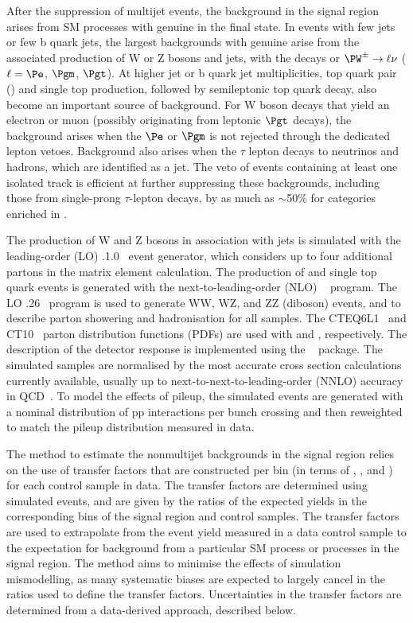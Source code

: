 After the suppression of multijet events, the background in the signal
region arises from SM processes with genuine \ptvecmiss in the final
state.  In events with few jets or few b quark jets, the largest
backgrounds with genuine \ptvecmiss arise from the associated
production of W or Z bosons and jets, with the decays \znunu or
$\PW^\pm \to  \ell\nu$ ($\ell=\Pe$, $\Pgm$, $\Pgt$). At
higher jet or b quark jet multiplicities, top quark pair (\ttbar) and
single top production, followed by semileptonic top quark decay, also
become an important source of background. For W boson decays that
yield an electron or muon (possibly originating from leptonic $\Pgt$
decays), the background arises when the $\Pe$ or $\Pgm$ is not
rejected through the dedicated lepton vetoes. Background also arises
when the $\tau$ lepton decays to neutrinos and hadrons, which are
identified as a jet. The veto of events containing at least one
isolated track is efficient at further suppressing these backgrounds,
including those from single-prong $\tau$-lepton decays, by as much as
$\sim$50\% for categories enriched in \ttbar.

The production of W and Z bosons in association with jets is simulated
with the leading-order (LO) .1.0~\cite{madgraph5} event
generator, which considers up to four additional partons in the matrix
element calculation. The production of \ttbar and single top quark
events is generated with the next-to-leading-order (NLO) ~\cite{powheg, Nason:2004rx, Alioli:2010xd, Frixione:2007nw}
program. The LO .26~\cite{pythia} program is used to
generate WW, WZ, and ZZ (diboson) events, and to describe parton
showering and hadronisation for all samples. The
{CTEQ6L1}~\cite{Pumplin:2002vw} and {CT10}~\cite{ct10} parton
distribution functions (PDFs) are used with \MADGRAPH and \POWHEG,
respectively. The description of the detector response is implemented
using the \GEANTfour~\cite{geant} package. The simulated samples are
normalised by the most accurate cross section calculations currently
available, usually up to next-to-next-to-leading-order (NNLO) accuracy
in QCD~\cite{xs-1, Gavin:2012sy, xs-2, xs-3, Czakon:2011xx}. To model
the effects of pileup, the simulated events are generated with a
nominal distribution of pp interactions per bunch crossing and then
reweighted to match the pileup distribution measured in data.

The method to estimate the nonmultijet backgrounds in the signal
region relies on the use of transfer factors that are constructed per
bin (in terms of \njet, \nb, and \scalht) for each control sample in
data. The transfer factors are determined using simulated events, and
are given by the ratios of the expected yields in the corresponding
bins of the signal region and control samples. The transfer factors
are used to extrapolate from the event yield measured in a data
control sample to the expectation for background from a particular SM
process or processes in the signal region. The method aims to minimise
the effects of simulation mismodelling, as many systematic biases are
expected to largely cancel in the ratios used to define the transfer
factors. Uncertainties in the transfer factors are determined from a
data-derived approach, described below.

